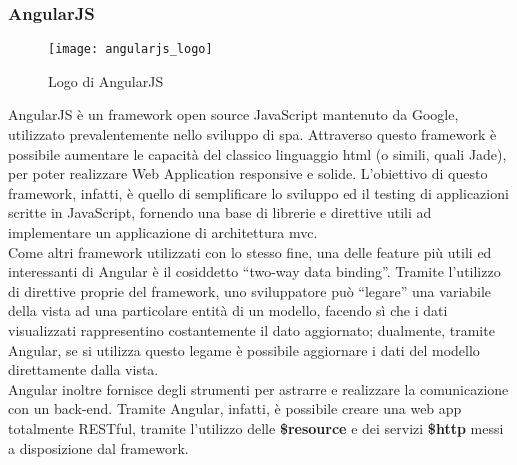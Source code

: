 \subsubsection{AngularJS}
\begin{figure}[H] 
    \centering 
    \texttt{[image: angularjs\_logo]} 
    \caption{Logo di AngularJS}
\end{figure}
AngularJS è un framework open source JavaScript mantenuto da Google, utilizzato prevalentemente nello sviluppo di \gls{spa}\glsfirstoccur. Attraverso questo framework è possibile aumentare le capacità del classico linguaggio \gls{html} (o simili, quali Jade), per poter realizzare Web Application responsive e solide. 
L’obiettivo di questo framework, infatti, è quello di semplificare lo sviluppo ed il testing di applicazioni scritte in JavaScript, fornendo una base di librerie e direttive utili ad implementare un applicazione di architettura \gls{mvc}.\\
Come altri framework utilizzati con lo stesso fine, una delle feature più utili ed interessanti di Angular è il cosiddetto “two-way data binding”. Tramite l’utilizzo di direttive proprie del framework, uno sviluppatore può “legare” una variabile della vista ad una particolare entità di un modello, facendo sì che i dati visualizzati rappresentino costantemente il dato aggiornato; dualmente, tramite Angular, se si utilizza questo legame è possibile aggiornare i dati del modello direttamente dalla vista.\\
Angular inoltre fornisce degli strumenti per astrarre e realizzare la comunicazione con un back-end. Tramite Angular, infatti, è possibile creare una web app totalmente RESTful, tramite l’utilizzo delle \textbf{\$resource} e dei servizi \textbf{\$http} messi a disposizione dal framework.

